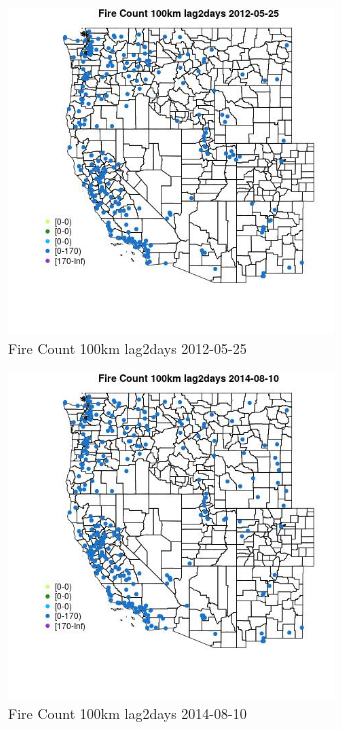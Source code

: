 \begin{figure} 
\centering  
\includegraphics[width=0.77\textwidth]{Code_Outputs/Report_ML_input_PM25_Step4_part_e_de_duplicated_aves_compiled_2019-05-18wNAs_MapObsFire_Count_100km_lag2days2012-05-25.jpg} 
\caption{\label{fig:Report_ML_input_PM25_Step4_part_e_de_duplicated_aves_compiled_2019-05-18wNAsMapObsFire_Count_100km_lag2days2012-05-25}Fire Count 100km lag2days 2012-05-25} 
\end{figure} 
 

\begin{figure} 
\centering  
\includegraphics[width=0.77\textwidth]{Code_Outputs/Report_ML_input_PM25_Step4_part_e_de_duplicated_aves_compiled_2019-05-18wNAs_MapObsFire_Count_100km_lag2days2014-08-10.jpg} 
\caption{\label{fig:Report_ML_input_PM25_Step4_part_e_de_duplicated_aves_compiled_2019-05-18wNAsMapObsFire_Count_100km_lag2days2014-08-10}Fire Count 100km lag2days 2014-08-10} 
\end{figure} 
 

